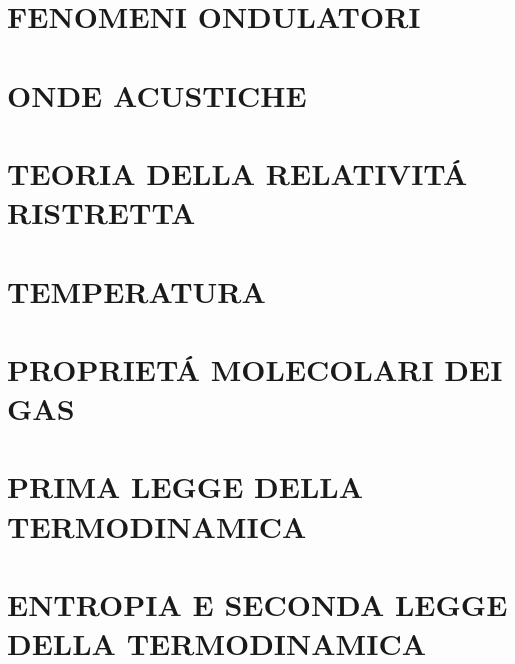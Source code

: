 \documentclass{article}
\begin{document}
	\section{FENOMENI ONDULATORI}
	\section{ONDE ACUSTICHE}
	\section{TEORIA DELLA RELATIVIT\'A RISTRETTA}
	\section{TEMPERATURA}
	\section{PROPRIET\'A MOLECOLARI DEI GAS}
	\section{PRIMA LEGGE DELLA TERMODINAMICA}
	\section{ENTROPIA E SECONDA LEGGE DELLA TERMODINAMICA}
\end{document}
